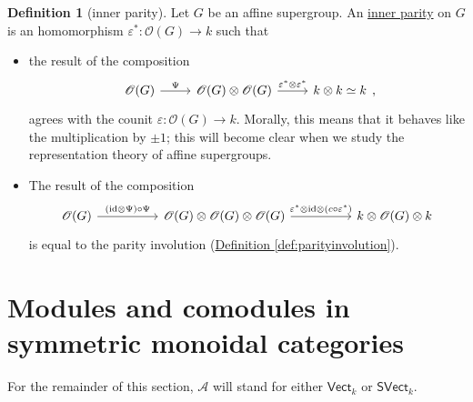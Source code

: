 \documentclass[a4paper,10pt]{scrreprt}
\newcommand{\defn}[1]{\ul{#1}}
\theoremstyle{definition}
\newtheorem{definition}{Definition}[section]
\theoremstyle{plain}
\theoremstyle{remark}
\begin{document}
\begin{definition}[inner parity]
  \label{def:innerparity}
  Let $G$ be an affine supergroup. An \defn{inner parity} on $G$ is an homomorphism $\varepsilon^{*}\colon \mathscr{O}(G) \to k$ such that
  \begin{itemize}
    \item the result of the composition
      \begin{equation*}
        \begin{tikzcd}
          \mathscr{O}(G) 
          \arrow[r, "\Psi"]
          & \mathscr{O}(G) \otimes \mathscr{O}(G)
          \arrow[r, "\varepsilon^{*} \otimes \varepsilon^{*}"]
          & k \otimes k \simeq k
        \end{tikzcd},
      \end{equation*}
      agrees with the counit $\varepsilon\colon \mathscr{O}(G) \to k$.
      Morally, this means that it behaves like the multiplication by $\pm 1$; this will become clear when we study the representation theory of affine supergroups.

    \item The result of the composition
      \begin{equation*}
        \begin{tikzcd}[column sep=huge]
          \mathscr{O}(G) 
          \arrow[r, "(\mathrm{id} \otimes \Psi) \circ \Psi"]
          & \mathscr{O}(G) \otimes \mathscr{O}(G) \otimes \mathscr{O}(G)
          \arrow[r, "\varepsilon^{*} \otimes \mathrm{id} \otimes (c \circ \varepsilon^{*})"]
          & k \otimes \mathscr{O}(G) \otimes k
        \end{tikzcd}
      \end{equation*}
      is equal to the parity involution (\hyperref[def:parityinvolution]{Definition \ref*{def:parityinvolution}}).
  \end{itemize}
\end{definition}

\section{Modules and comodules in symmetric monoidal categories} \label{sec:modulesandcomodules}
For the remainder of this section, $\mathscr{A}$ will stand for either $\mathsf{Vect}_{k}$ or $\mathsf{SVect}_{k}$.
\end{document}
